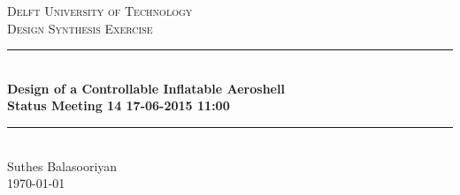 \documentclass[12pt]{report}
\newcommand{\HRule}{\rule{\linewidth}{0.04cm}}
\begin{document}
\clearpage
\thispagestyle{empty}

\begin{center}

\textsc{\LARGE Delft University of Technology}\\[0.3cm]
\textsc{\Large Design Synthesis Exercise}\\[0.5cm]

\HRule \\[0.4cm]
{\Large \bfseries Design of a Controllable Inflatable Aeroshell}\\[0.2cm]
{\Huge \bfseries Status Meeting 14 17-06-2015 11:00}\\[0.2cm]
\HRule \\[1.2cm]

\vspace{10mm}
Suthes Balasooriyan
\\
\today
\\


\end{center}



\newpage

\end{document}
